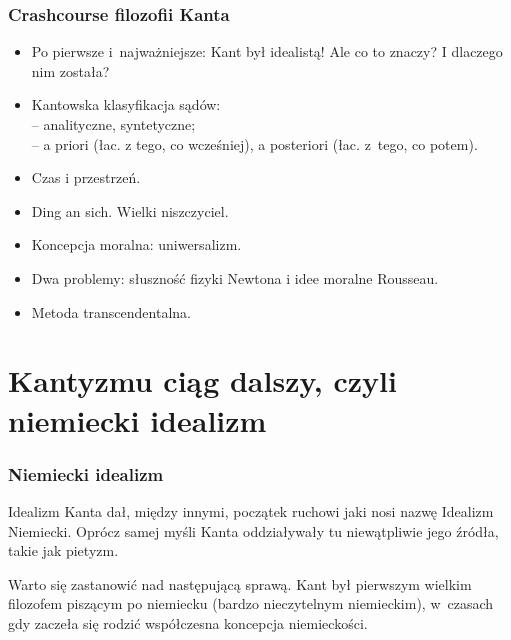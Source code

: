 \documentclass[10pt,t]{beamer}
\begin{document}
\begin{frame}
  \frametitle{Crashcourse filozofii Kanta}


  \begin{itemize}

  \item Po pierwsze i~najważniejsze: Kant był idealistą! Ale co to znaczy? I dlaczego nim została?

  \item Kantowska klasyfikacja sądów: \\
    -- analityczne, syntetyczne; \\
    -- a priori (łac. z tego, co wcześniej), a posteriori (łac. z~tego, co
    potem).

  \item Czas i przestrzeń.

  \item Ding an sich. Wielki niszczyciel.

  \item Koncepcja moralna: uniwersalizm.

  \item Dwa problemy: słuszność fizyki Newtona i idee moralne Rousseau.

  \item Metoda transcendentalna.

  \end{itemize}

\end{frame}










\section{Kantyzmu ciąg dalszy, czyli niemiecki idealizm}



\begin{frame}
  \frametitle{Niemiecki idealizm}


  Idealizm Kanta dał, między innymi, początek ruchowi jaki nosi nazwę
  Idealizm Niemiecki. Oprócz samej myśli Kanta oddziaływały tu
  niewątpliwie jego źródła, takie jak pietyzm.

  Warto się zastanowić nad następującą sprawą. Kant był pierwszym
  wielkim filozofem piszącym po niemiecku (bardzo nieczytelnym
  niemieckim), w~czasach gdy zaczeła się rodzić współczesna koncepcja
  niemieckości.

\end{frame}
\end{document}
